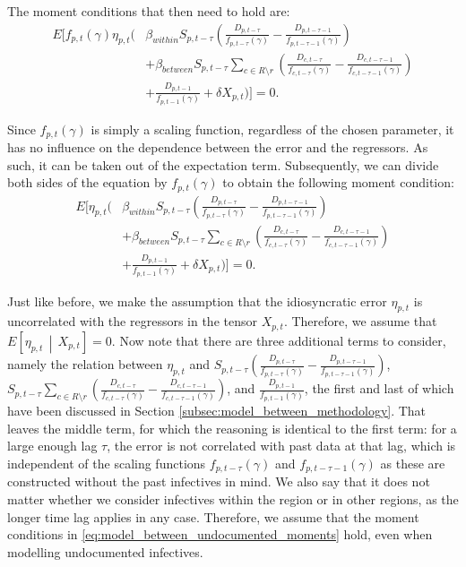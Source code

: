 \documentclass[12pt]{article}
\begin{document}
	\noindent The moment conditions that then need to hold are:
	    \begin{equation} \label{eq:model_between_undocumented_moments}
            \begin{split}
    	        E\Bigg[ f_{p,t}(\gamma) \eta_{p,t}\Bigg( &\beta_{within}S_{p,t-\tau}\left(\frac{D_{p,t-\tau}}{f_{p,t-\tau}(\gamma)} - \frac{D_{p,t-\tau-1}}{f_{p,t-\tau-1}(\gamma)}\right) \\
    	        &+ \beta_{between}S_{p,t-\tau} \sum_{c \in R \setminus r} \left(\frac{D_{c,t-\tau}}{f_{c,t-\tau}(\gamma)} - \frac{D_{c,t-\tau-1}}{f_{c,t-\tau-1}(\gamma)} \right) \\
    	        &+ \frac{D_{p,t-1}}{f_{p,t-1}(\gamma)} + \delta X_{p,t} \Bigg) \Bigg] = 0.
	        \end{split}
        \end{equation}
	
	Since $f_{p,t}(\gamma)$ is simply a scaling function, regardless of the chosen parameter, it has no influence on the dependence between the error and the regressors. As such, it can be taken out of the expectation term. Subsequently, we can divide both sides of the equation by $f_{p,t}(\gamma)$ to obtain the following moment condition:
        \begin{align*}
    		E\Bigg[ \eta_{p,t}\Bigg( &\beta_{within}S_{p,t-\tau}\left(\frac{D_{p,t-\tau}}{f_{p,t-\tau}(\gamma)} - \frac{D_{p,t-\tau-1}}{f_{p,t-\tau-1}(\gamma)}\right) \\
	        &+ \beta_{between}S_{p,t-\tau} \sum_{c \in R \setminus r} \left(\frac{D_{c,t-\tau}}{f_{c,t-\tau}(\gamma)} - \frac{D_{c,t-\tau-1}}{f_{c,t-\tau-1}(\gamma)} \right) \\
	        &+ \frac{D_{p,t-1}}{f_{p,t-1}(\gamma)} + \delta X_{p,t} \Bigg) \Bigg] = 0.
        \end{align*}
	
	Just like before, we make the assumption that the idiosyncratic error $\eta_{p,t}$ is uncorrelated with the regressors in the tensor $X_{p,t}$. Therefore, we assume that $E\left[\eta_{p,t} \,\middle|\, X_{p,t}\right] = 0$. Now note that there are three additional terms to consider, namely the relation between $\eta_{p,t}$ and $S_{p,t-\tau}\left(\frac{D_{p,t-\tau}}{f_{p,t-\tau}(\gamma)} - \frac{D_{p,t-\tau-1}}{f_{p,t-\tau-1}(\gamma)}\right)$, $S_{p,t-\tau} \sum_{c \in R \setminus r} \left(\frac{D_{c,t-\tau}}{f_{c,t-\tau}(\gamma)} - \frac{D_{c,t-\tau-1}}{f_{c,t-\tau-1}(\gamma)} \right)$, and $\frac{D_{p,t-1}}{f_{p,t-1}(\gamma)}$, the first and last of which have been discussed in Section \ref{subsec:model_between_methodology}. That leaves the middle term, for which the reasoning is identical to the first term: for a large enough lag $\tau$, the error is not correlated with past data at that lag, which is independent of the scaling functions $f_{p,t-\tau}(\gamma)$ and $f_{p,t-\tau-1}(\gamma)$ as these are constructed without the past infectives in mind. We also say that it does not matter whether we consider infectives within the region or in other regions, as the longer time lag applies in any case. Therefore, we assume that the moment conditions in \eqref{eq:model_between_undocumented_moments} hold, even when modelling undocumented infectives.
	
\end{document}

